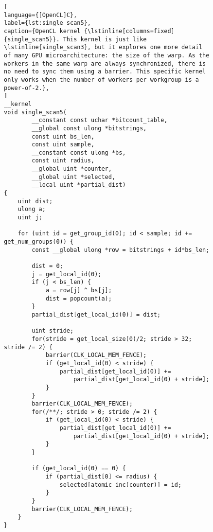 \begin{figure}[!p]
\begin{lstlisting}[
language={[OpenCL]C},
label={lst:single_scan5},
caption={OpenCL kernel {\lstinline[columns=fixed]{single_scan5}}. This kernel is just like \lstinline{single_scan3}, but it explores one more detail of many GPU microarchitecture: the size of the warp. As the workers in the same warp are always synchronized, there is no need to sync them using a barrier. This specific kernel only works when the number of workers per workgroup is a power-of-2.},
]
__kernel
void single_scan5(
        __constant const uchar *bitcount_table,
        __global const ulong *bitstrings,
        const uint bs_len,
        const uint sample,
        __constant const ulong *bs,
        const uint radius,
        __global uint *counter,
        __global uint *selected,
        __local uint *partial_dist)
{
    uint dist;
    ulong a;
    uint j;

    for (uint id = get_group_id(0); id < sample; id += get_num_groups(0)) {
        const __global ulong *row = bitstrings + id*bs_len;

        dist = 0;
        j = get_local_id(0);
        if (j < bs_len) {
            a = row[j] ^ bs[j];
            dist = popcount(a);
        }
        partial_dist[get_local_id(0)] = dist;

        uint stride;
        for(stride = get_local_size(0)/2; stride > 32; stride /= 2) {
            barrier(CLK_LOCAL_MEM_FENCE);
            if (get_local_id(0) < stride) {
                partial_dist[get_local_id(0)] +=
                    partial_dist[get_local_id(0) + stride];
            }
        }
        barrier(CLK_LOCAL_MEM_FENCE);
        for(/**/; stride > 0; stride /= 2) {
            if (get_local_id(0) < stride) {
                partial_dist[get_local_id(0)] +=
                    partial_dist[get_local_id(0) + stride];
            }
        }

        if (get_local_id(0) == 0) {
            if (partial_dist[0] <= radius) {
                selected[atomic_inc(counter)] = id;
            }
        }
        barrier(CLK_LOCAL_MEM_FENCE);
    }
}
\end{lstlisting}
\end{figure}

